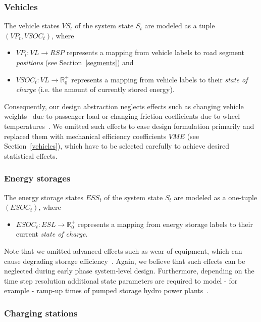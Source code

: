 \subsubsection{Vehicles}
\label{states_vehicles}

The vehicle states $VS_t$ of the system state $S_t$ are modeled as a tuple $(VP_t, VSOC_t)$, where
\begin{itemize}
	\item $VP_t: VL \rightarrow RSP$ represents a mapping from vehicle labels to road segment \textit{positions} (see Section~\ref{segments}) and
	\item $VSOC_t: VL \rightarrow \mathbb{R}_0^+$ represents a mapping from vehicle labels to their \textit{state of charge} (i.e. the amount of currently stored energy).
\end{itemize}
Consequently, our design abstraction neglects effects such as changing vehicle weights~\cite{?} due to passenger load or changing friction coefficients due to wheel temperatures~\cite{?}. We omitted such effects to ease design formulation primarily and replaced them with mechanical efficiency coefficients $VME$ (see Section~\ref{vehicles}), which have to be selected carefully to achieve desired statistical effects.

\subsubsection{Energy storages}
\label{states_storages}

The energy storage states $ESS_t$ of the system state $S_t$ are modeled as a one-tuple $(ESOC_t)$, where
\begin{itemize}
	\item $ESOC_t: ESL \rightarrow \mathbb{R}_0^+$ represents a mapping from energy storage labels to their current \textit{state of charge}. 
\end{itemize}
Note that we omitted advanced effects such as wear of equipment, which can cause degrading storage efficiency~\cite{?}. Again, we believe that such effects can be neglected during early phase system-level design. Furthermore, depending on the time step resolution additional state parameters are required to model - for example - ramp-up times of pumped storage hydro power plants~\cite{Garcia2008}.

\subsubsection{Charging stations}
\label{states_stations}

